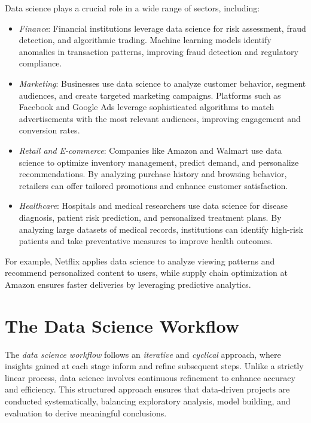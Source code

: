 \documentclass[
]{book}
\providecommand{\tightlist}{%
  \setlength{\itemsep}{0pt}\setlength{\parskip}{0pt}}
\theoremstyle{definition}
\theoremstyle{definition}
\theoremstyle{definition}
\theoremstyle{definition}
\theoremstyle{remark}
\begin{document}
Data science plays a crucial role in a wide range of sectors, including:

\begin{itemize}
\tightlist
\item
  \emph{Finance}: Financial institutions leverage data science for risk assessment, fraud detection, and algorithmic trading. Machine learning models identify anomalies in transaction patterns, improving fraud detection and regulatory compliance.\\
\item
  \emph{Marketing}: Businesses use data science to analyze customer behavior, segment audiences, and create targeted marketing campaigns. Platforms such as Facebook and Google Ads leverage sophisticated algorithms to match advertisements with the most relevant audiences, improving engagement and conversion rates.\\
\item
  \emph{Retail and E-commerce}: Companies like Amazon and Walmart use data science to optimize inventory management, predict demand, and personalize recommendations. By analyzing purchase history and browsing behavior, retailers can offer tailored promotions and enhance customer satisfaction.\\
\item
  \emph{Healthcare}: Hospitals and medical researchers use data science for disease diagnosis, patient risk prediction, and personalized treatment plans. By analyzing large datasets of medical records, institutions can identify high-risk patients and take preventative measures to improve health outcomes.
\end{itemize}

For example, Netflix applies data science to analyze viewing patterns and recommend personalized content to users, while supply chain optimization at Amazon ensures faster deliveries by leveraging predictive analytics.

\section{The Data Science Workflow}\label{the-data-science-workflow}

The \emph{data science workflow} follows an \emph{iterative} and \emph{cyclical} approach, where insights gained at each stage inform and refine subsequent steps. Unlike a strictly linear process, data science involves continuous refinement to enhance accuracy and efficiency. This structured approach ensures that data-driven projects are conducted systematically, balancing exploratory analysis, model building, and evaluation to derive meaningful conclusions.
\end{document}
